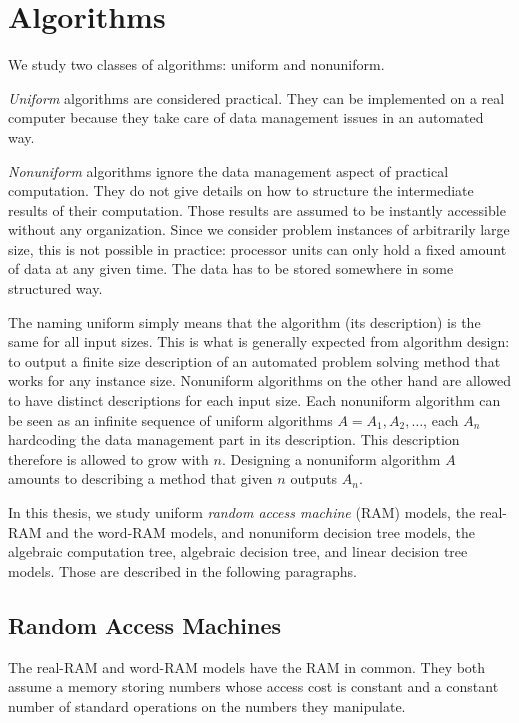 \section{Algorithms}%
\label{sec:models-of-computation:algorithms}

We study two classes of algorithms: uniform and nonuniform.

\emph{Uniform} algorithms are considered practical. They can be implemented on
a real computer because they take care of data management issues in an
automated way.

\emph{Nonuniform} algorithms ignore the data management aspect of practical
computation. They do not give details on how to structure the intermediate
results of their computation. Those results are assumed to be instantly
accessible without any organization. Since we consider problem instances of
arbitrarily large size, this is not possible in practice:
processor units can only hold a fixed amount of data at any given time. The
data has to be stored somewhere in some structured way.

The naming uniform simply means that the algorithm (its description) is the
same for all input sizes. This is what is generally expected from algorithm
design: to output a finite size description of an automated problem solving
method that works for any instance size.
%
Nonuniform algorithms on the other hand are allowed to have distinct
descriptions for each input size. Each nonuniform algorithm can be seen as an
infinite sequence of uniform algorithms \(A = A_1, A_2, \ldots\), each \(A_n\)
hardcoding the data management part in its description. This description
therefore is allowed to grow with \(n\).
Designing a nonuniform algorithm \(A\) amounts to describing a method
that given \(n\) outputs \(A_n\).

In this thesis, we study uniform
\emph{random access machine} (RAM) models,
the real-RAM and the word-RAM models,
%
and nonuniform decision tree models,
the algebraic computation tree,
algebraic decision tree,
and linear decision tree models.
%
Those are described in the following paragraphs.

\subsection{Random Access Machines}%
\label{sec:models-of-computation:algorithms:ram}

The real-RAM and word-RAM models have the RAM in common. They both assume a
memory storing numbers whose access cost is constant and a constant number of
standard operations on the numbers they manipulate.

